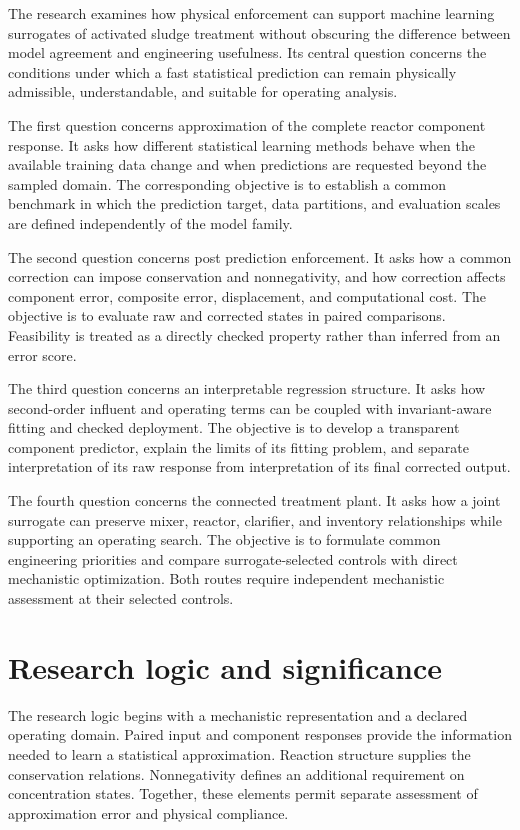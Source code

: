 The research examines how physical enforcement can support machine learning surrogates of activated sludge treatment without obscuring the difference between model agreement and engineering usefulness. Its central question concerns the conditions under which a fast statistical prediction can remain physically admissible, understandable, and suitable for operating analysis.

The first question concerns approximation of the complete reactor component response. It asks how different statistical learning methods behave when the available training data change and when predictions are requested beyond the sampled domain. The corresponding objective is to establish a common benchmark in which the prediction target, data partitions, and evaluation scales are defined independently of the model family.

The second question concerns post prediction enforcement. It asks how a common correction can impose conservation and nonnegativity, and how correction affects component error, composite error, displacement, and computational cost. The objective is to evaluate raw and corrected states in paired comparisons. Feasibility is treated as a directly checked property rather than inferred from an error score.

The third question concerns an interpretable regression structure. It asks how second-order influent and operating terms can be coupled with invariant-aware fitting and checked deployment. The objective is to develop a transparent component predictor, explain the limits of its fitting problem, and separate interpretation of its raw response from interpretation of its final corrected output.

The fourth question concerns the connected treatment plant. It asks how a joint surrogate can preserve mixer, reactor, clarifier, and inventory relationships while supporting an operating search. The objective is to formulate common engineering priorities and compare surrogate-selected controls with direct mechanistic optimization. Both routes require independent mechanistic assessment at their selected controls.

\section{Research logic and significance}

The research logic begins with a mechanistic representation and a declared operating domain. Paired input and component responses provide the information needed to learn a statistical approximation. Reaction structure supplies the conservation relations. Nonnegativity defines an additional requirement on concentration states. Together, these elements permit separate assessment of approximation error and physical compliance.

